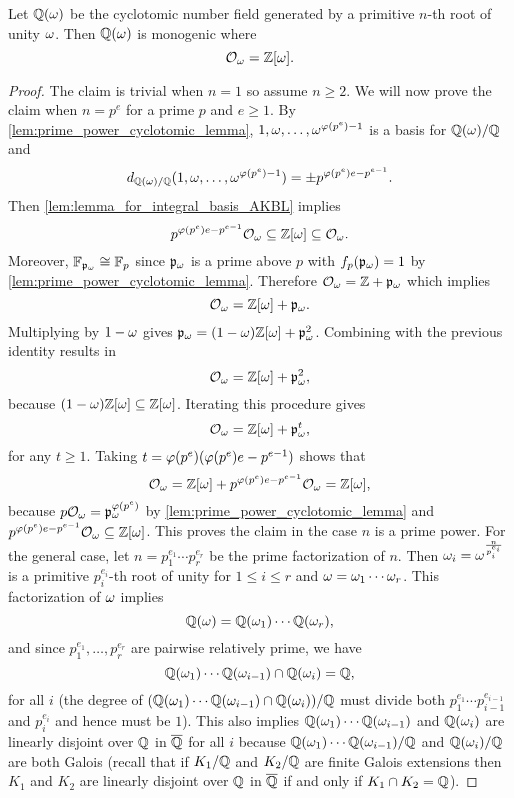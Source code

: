     \begin{proposition}
      Let $\mathbb{Q}(\omega)$ be the cyclotomic number field generated by a primitive $n$-th root of unity $\omega$. Then $\mathbb{Q}(\omega)$ is monogenic where
      \[
        \mathcal{O}_{\omega} = \mathbb{Z}[\omega].
      \]
    \end{proposition}
    \begin{proof}
      The claim is trivial when $n = 1$ so assume $n \ge 2$. We will now prove the claim when $n = p^{e}$ for a prime $p$ and $e \ge 1$. By \cref{lem:prime_power_cyclotomic_lemma}, $1,\omega,\ldots,\omega^{\varphi(p^{e})-1}$ is a basis for $\mathbb{Q}(\omega)/\mathbb{Q}$ and
      \[
        d_{\mathbb{Q}(\omega)/\mathbb{Q}}(1,\omega,\ldots,\omega^{\varphi(p^{e})-1}) = \pm p^{\varphi(p^{e})e-p^{e-1}}.
      \]
      Then \cref{lem:lemma_for_integral_basis_AKBL} implies
      \[
        p^{\varphi(p^{e})e-p^{e-1}}\mathcal{O}_{\omega} \subseteq \mathbb{Z}[\omega] \subseteq \mathcal{O}_{\omega}.
      \]
      Moreover, $\mathbb{F}_{\mathfrak{p}_{\omega}} \cong \mathbb{F}_{p}$ since $\mathfrak{p}_{\omega}$ is a prime above $p$ with $f_{p}(\mathfrak{p}_{\omega}) = 1$ by \cref{lem:prime_power_cyclotomic_lemma}. Therefore $\mathcal{O}_{\omega} = \mathbb{Z}+\mathfrak{p}_{\omega}$ which implies
      \[
        \mathcal{O}_{\omega} = \mathbb{Z}[\omega]+\mathfrak{p}_{\omega}.
      \]
      Multiplying by $1-\omega$ gives $\mathfrak{p}_{\omega} = (1-\omega)\mathbb{Z}[\omega]+\mathfrak{p}_{\omega}^{2}$. Combining with the previous identity results in
      \[
        \mathcal{O}_{\omega} = \mathbb{Z}[\omega]+\mathfrak{p}_{\omega}^{2},
      \]
      because $(1-\omega)\mathbb{Z}[\omega] \subseteq \mathbb{Z}[\omega]$. Iterating this procedure gives
      \[
        \mathcal{O}_{\omega} = \mathbb{Z}[\omega]+\mathfrak{p}_{\omega}^{t},
      \]
      for any $t \ge 1$. Taking $t = \varphi(p^{e})(\varphi(p^{e})e-p^{e-1})$ shows that
      \[
        \mathcal{O}_{\omega} = \mathbb{Z}[\omega]+p^{\varphi(p^{e})e-p^{e-1}}\mathcal{O}_{\omega} = \mathbb{Z}[\omega],
      \]
      because $p\mathcal{O}_{\omega} = \mathfrak{p}_{\omega}^{\varphi(p^{e})}$ by \cref{lem:prime_power_cyclotomic_lemma} and $p^{\varphi(p^{e})e-p^{e-1}}\mathcal{O}_{\omega} \subseteq \mathbb{Z}[\omega]$. This proves the claim in the case $n$ is a prime power. For the general case, let $n = p_{1}^{e_{1}} \cdots p_{r}^{e_{r}}$ be the prime factorization of $n$. Then $\omega_{i} = \omega^{\frac{n}{ p_{i}^{e_{i}}}}$ is a primitive $p_{i}^{e_{i}}$-th root of unity for $1 \le i \le r$ and $\omega = \omega_{1} \cdots \omega_{r}$. This factorization of $\omega$ implies
      \[
        \mathbb{Q}(\omega) = \mathbb{Q}(\omega_{1}) \cdots \mathbb{Q}(\omega_{r}),
      \]
      and since $p_{1}^{e_{1}},\ldots,p_{r}^{e_{r}}$ are pairwise relatively prime, we have
      \[
        \mathbb{Q}(\omega_{1}) \cdots \mathbb{Q}(\omega_{i-1}) \cap \mathbb{Q}(\omega_{i}) = \mathbb{Q},
      \]
      for all $i$ (the degree of $(\mathbb{Q}(\omega_{1}) \cdots \mathbb{Q}(\omega_{i-1}) \cap \mathbb{Q}(\omega_{i}))/\mathbb{Q}$ must divide both $ p_{1}^{e_{1}} \cdots p_{i-1}^{e_{i-1}}$ and $p_{i}^{e_{i}}$ and hence must be $1$). This also implies $\mathbb{Q}(\omega_{1}) \cdots \mathbb{Q}(\omega_{i-1})$ and $\mathbb{Q}(\omega_{i})$ are linearly disjoint over $\mathbb{Q}$ in $\overline{\mathbb{Q}}$ for all $i$ because $\mathbb{Q}(\omega_{1}) \cdots \mathbb{Q}(\omega_{i-1})/\mathbb{Q}$ and $\mathbb{Q}(\omega_{i})/\mathbb{Q}$ are both Galois (recall that if $K_{1}/\mathbb{Q}$ and $K_{2}/\mathbb{Q}$ are finite Galois extensions then $K_{1}$ and $K_{2}$ are linearly disjoint over $\mathbb{Q}$ in $\overline{\mathbb{Q}}$ if and only if $K_{1} \cap K_{2} = \mathbb{Q}$). 
    \end{proof}